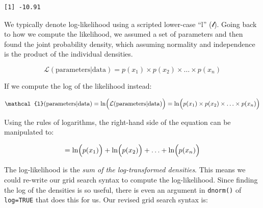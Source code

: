 \documentclass[]{book}
\newenvironment{Shaded}{\begin{snugshade}}{\end{snugshade}}
\newcommand{\DataTypeTok}[1]{\textcolor[rgb]{0.13,0.29,0.53}{#1}}
\newcommand{\DecValTok}[1]{\textcolor[rgb]{0.00,0.00,0.81}{#1}}
\newcommand{\FloatTok}[1]{\textcolor[rgb]{0.00,0.00,0.81}{#1}}
\newcommand{\KeywordTok}[1]{\textcolor[rgb]{0.13,0.29,0.53}{\textbf{#1}}}
\newcommand{\NormalTok}[1]{#1}
\newcommand{\OperatorTok}[1]{\textcolor[rgb]{0.81,0.36,0.00}{\textbf{#1}}}
\newcommand{\OtherTok}[1]{\textcolor[rgb]{0.56,0.35,0.01}{#1}}
\newcommand{\StringTok}[1]{\textcolor[rgb]{0.31,0.60,0.02}{#1}}
\begin{document}
\begin{verbatim}
[1] -10.91
\end{verbatim}

We typically denote log-likelihood using a scripted lower-case ``l'' (\(\mathcal{l}\)). Going back to how we compute the likelihood, we assumed a set of parameters and then found the joint probability density, which assuming normality and independence is the product of the individual densities.

\[
\mathcal{L}(\mathrm{parameters} | \mathrm{data}) = p(x_1) \times p(x_2) \times \ldots \times p(x_n)
\]

If we compute the log of the likelihood instead:

\[
\mathcal{l}(\mathrm{parameters} | \mathrm{data}) =  \ln \Bigl(\mathcal{L}(\mathrm{parameters} | \mathrm{data})\Bigr) = \ln \Bigl(p(x_1) \times p(x_2) \times \ldots \times p(x_n)\Bigr)
\]

Using the rules of logarithms, the right-hand side of the equation can be manipulated to:

\[
= \ln \Bigl(p(x_1)\Bigr) + \ln \Bigl(p(x_2)\Bigr) + \ldots + \ln \Bigl(p(x_n)\Bigr)
\]

The log-likelihood is the \emph{sum of the log-transformed densities}. This means we could re-write our grid search syntax to compute the log-likelihood. Since finding the log of the densities is so useful, there is even an argument in \texttt{dnorm()} of \texttt{log=TRUE} that does this for us. Our revised grid search syntax is:

\begin{Shaded}
\end{Shaded}
\end{document}
